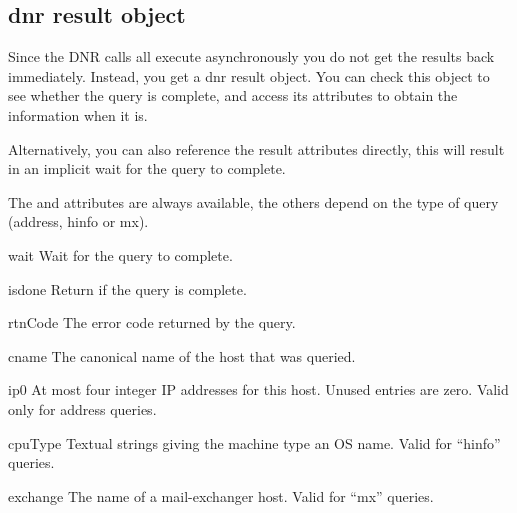 \subsection{dnr result object}

Since the DNR calls all execute asynchronously you do not get the
results back immediately.  Instead, you get a dnr result object.  You
can check this object to see whether the query is complete, and access
its attributes to obtain the information when it is.

Alternatively, you can also reference the result attributes directly,
this will result in an implicit wait for the query to complete.

The  and  attributes are always
available, the others depend on the type of query (address, hinfo or
mx).


\begin{funcdesc}{wait}{}
Wait for the query to complete.
\end{funcdesc}

\begin{funcdesc}{isdone}{}
Return  if the query is complete.
\end{funcdesc}


\begin{datadesc}{rtnCode}
The error code returned by the query.
\end{datadesc}

\begin{datadesc}{cname}
The canonical name of the host that was queried.
\end{datadesc}

\begin{datadesc}{ip0}
At most four integer IP addresses for this host.  Unused entries are
zero.  Valid only for address queries.
\end{datadesc}

\begin{datadesc}{cpuType}
Textual strings giving the machine type an OS name.  Valid for ``hinfo''
queries.
\end{datadesc}

\begin{datadesc}{exchange}
The name of a mail-exchanger host.  Valid for ``mx'' queries.
\end{datadesc}

